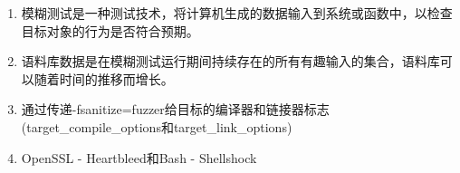 

\begin{enumerate}
\item 
模糊测试是一种测试技术，将计算机生成的数据输入到系统或函数中，以检查目标对象的行为是否符合预期。

\item
语料库数据是在模糊测试运行期间持续存在的所有有趣输入的集合，语料库可以随着时间的推移而增长。

\item 
通过传递-fsanitize=fuzzer给目标的编译器和链接器标志(target\_compile\_options和target\_link\_options)

\item 
OpenSSL - Heartbleed和Bash - Shellshock
\end{enumerate}